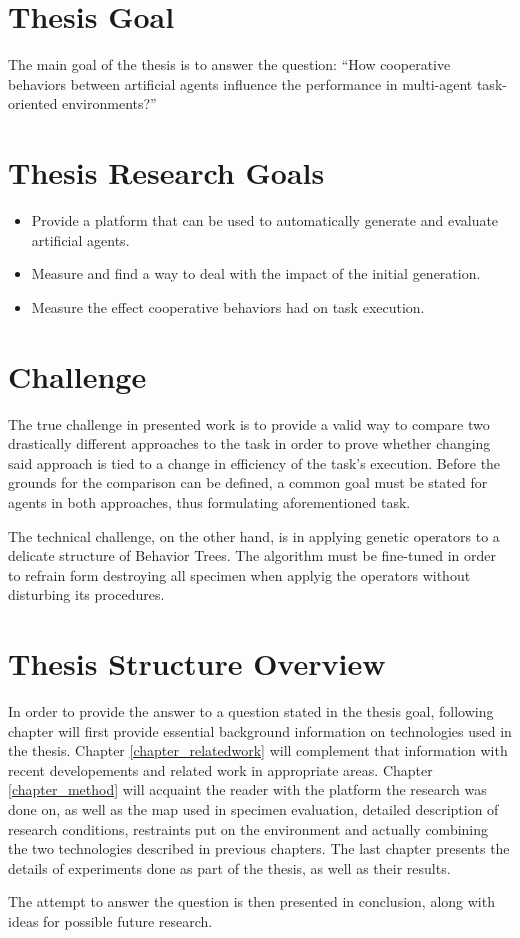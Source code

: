 \section{Thesis Goal}
The main goal of the thesis is to answer the question:
``How cooperative behaviors between artificial agents influence the performance in multi-agent task-oriented environments?'' %
\section{Thesis Research Goals}
\begin{itemize}
    \item Provide a platform that can be used to automatically generate and evaluate artificial agents.
    \item Measure and find a way to deal with the impact of the initial generation.
    \item Measure the effect cooperative behaviors had on task execution.
\end{itemize}
\section{Challenge}
The true challenge in presented work is to provide a valid way to compare two drastically different approaches to the task in order to prove whether changing said approach is tied to a change in efficiency of the task's execution. Before the grounds for the comparison can be defined, a common goal must be stated for agents in both approaches, thus formulating aforementioned task.

The technical challenge, on the other hand, is in applying genetic operators to a delicate structure of Behavior Trees. The algorithm must be fine-tuned in order to refrain form destroying all specimen when applyig the operators without disturbing its procedures.
\section{Thesis Structure Overview}
In order to provide the answer to a question stated in the thesis goal, following chapter will first provide essential background information on technologies used in the thesis. Chapter \ref{chapter_relatedwork} will complement that information with recent developements and related work in appropriate areas. Chapter \ref{chapter_method} will acquaint the reader with the platform the research was done on, as well as the map used in specimen evaluation, detailed description of research conditions, restraints put on the environment and actually combining the two technologies described in previous chapters. The last chapter presents the details of experiments done as part of the thesis, as well as their results.

The attempt to answer the question is then presented in conclusion, along with ideas for possible future research.
